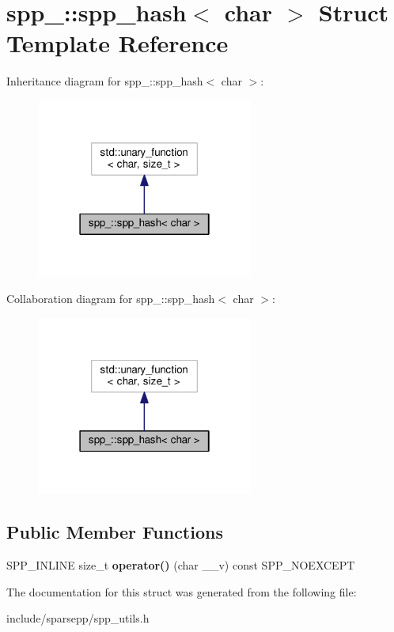 \hypertarget{structspp___1_1spp__hash_3_01char_01_4}{}\section{spp\+\_\+\+:\+:spp\+\_\+hash$<$ char $>$ Struct Template Reference}
\label{structspp___1_1spp__hash_3_01char_01_4}


Inheritance diagram for spp\+\_\+\+:\+:spp\+\_\+hash$<$ char $>$\+:\nopagebreak
\begin{figure}[H]
\begin{center}
\leavevmode
\includegraphics[width=202pt]{structspp___1_1spp__hash_3_01char_01_4__inherit__graph}
\end{center}
\end{figure}


Collaboration diagram for spp\+\_\+\+:\+:spp\+\_\+hash$<$ char $>$\+:\nopagebreak
\begin{figure}[H]
\begin{center}
\leavevmode
\includegraphics[width=202pt]{structspp___1_1spp__hash_3_01char_01_4__coll__graph}
\end{center}
\end{figure}
\subsection*{Public Member Functions}
\begin{DoxyCompactItemize}
\item 
S\+P\+P\+\_\+\+I\+N\+L\+I\+NE size\+\_\+t {\bfseries operator()} (char \+\_\+\+\_\+v) const S\+P\+P\+\_\+\+N\+O\+E\+X\+C\+E\+PT\hypertarget{structspp___1_1spp__hash_3_01char_01_4_aae93055a1f5075a3ab94568dab636b3b}{}\label{structspp___1_1spp__hash_3_01char_01_4_aae93055a1f5075a3ab94568dab636b3b}

\end{DoxyCompactItemize}


The documentation for this struct was generated from the following file\+:\begin{DoxyCompactItemize}
\item 
include/sparsepp/spp\+\_\+utils.\+h\end{DoxyCompactItemize}
